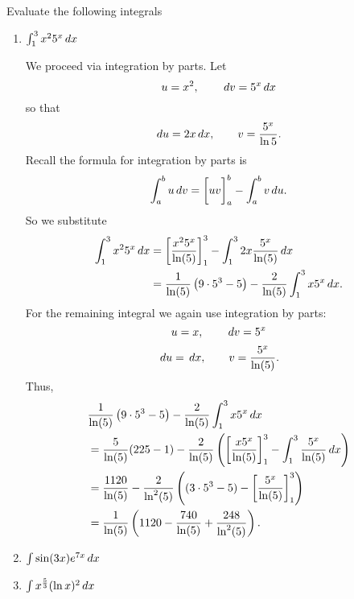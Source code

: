 \documentclass[]{ximera}
\begin{document}
\begin{problem}
Evaluate the following integrals
	\begin{enumerate}
	
	\item  $\int_1^3 x^2 5^x \,d x$
	\begin{freeResponse}
	We proceed via integration by parts.  Let 
		\[
		u = x^2, \qquad \,d v = 5^x \,d x
		\]
	so that
		\[
		\,d u = 2x \,d x, \qquad v = \frac{5^x}{\ln 5} .
		\]
	Recall the formula for integration by parts is
		\[
		\int_a^b u \,d v = \bigg[ uv \bigg]_a^b - \int_a^b v \,d u.
		\]
	So we substitute
		\begin{align*}
		\int_1^3 x^2 5^x \,d x &= \bigg[ \frac{x^2 5^x}{\ln(5)} \bigg]_1^3 - \int_1^3 2x \frac{5^x}{\ln(5)} \,d x  \\
		&= \frac{1}{\ln(5)} \left( 9 \cdot 5^3 - 5 \right) - \frac{2}{\ln(5)} \int_1^3 x 5^x \,d x.
		\end{align*}
	For the remaining integral we again use integration by parts:
		\[
		u = x, \qquad \,d v = 5^x  
		\]
		\[
		\,d u = \,d x, \qquad v = \frac{5^x}{\ln(5)}.
		\]
	Thus,
		\begin{align*}
		&\frac{1}{\ln(5)} \left( 9 \cdot 5^3 - 5 \right) - \frac{2}{\ln(5)} \int_1^3 x 5^x \,d x \\
		&= \frac{5}{\ln(5)} (225 - 1) - \frac{2}{\ln(5)} \left( \bigg[ \frac{x5^x}{\ln(5)} \bigg]_1^3 - \int_1^3 \frac{5^x}{\ln(5)} \,d x \right)  \\
		&= \frac{1120}{\ln(5)} - \frac{2}{\ln^2(5)} \left( (3 \cdot 5^3 - 5) - \bigg[ \frac{5^x}{\ln(5)} \bigg]_1^3 \right)  \\
		&= \frac{1}{\ln(5)} \left( 1120 - \frac{740}{\ln(5)} + \frac{248}{\ln^2(5)} \right).
		\end{align*}
	\end{freeResponse}
	
	
	
	\item  $\int \sin(3x) e^{7x} \,d x$
	\begin{freeResponse}
	
	\end{freeResponse}
	
	
	
	\item  $\int x^{\frac{5}{3}} (\ln x)^2 \,d x$
	\begin{freeResponse}
	
	\end{freeResponse}
	
	\end{enumerate}
	
\end{problem}
\end{document}
